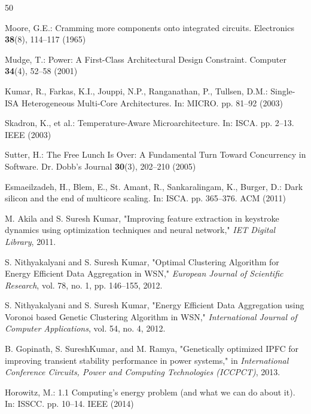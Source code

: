 \documentclass[conference]{IEEEtran}
\begin{document}
\begin{thebibliography}{50}

 Moore, G.E.: Cramming more components onto integrated circuits. Electronics \textbf{38}(8), 114--117 (1965)

 Mudge, T.: Power: A First-Class Architectural Design Constraint. Computer \textbf{34}(4), 52--58 (2001)

 Kumar, R., Farkas, K.I., Jouppi, N.P., Ranganathan, P., Tullsen, D.M.: Single-ISA Heterogeneous Multi-Core Architectures. In: MICRO. pp. 81--92 (2003)

 Skadron, K., et al.: Temperature-Aware Microarchitecture. In: ISCA. pp. 2--13. IEEE (2003)


 Sutter, H.: The Free Lunch Is Over: A Fundamental Turn Toward Concurrency in Software. Dr. Dobb's Journal \textbf{30}(3), 202--210 (2005)

 Esmaeilzadeh, H., Blem, E., St. Amant, R., Sankaralingam, K., Burger, D.: Dark silicon and the end of multicore scaling. In: ISCA. pp. 365--376. ACM (2011)

 M. Akila and S. Suresh Kumar, "Improving feature extraction in keystroke dynamics using optimization techniques and neural network," \textit{IET Digital Library}, 2011.

 S. Nithyakalyani and S. Suresh Kumar, "Optimal Clustering Algorithm for Energy Efficient Data Aggregation in WSN," \textit{European Journal of Scientific Research}, vol. 78, no. 1, pp. 146--155, 2012.

 S. Nithyakalyani and S. Suresh Kumar, "Energy Efficient Data Aggregation using Voronoi based Genetic Clustering Algorithm in WSN," \textit{International Journal of Computer Applications}, vol. 54, no. 4, 2012.

 B. Gopinath, S. SureshKumar, and M. Ramya, "Genetically optimized IPFC for improving transient stability performance in power systems," in \textit{International Conference Circuits, Power and Computing Technologies (ICCPCT)}, 2013.

 Horowitz, M.: 1.1 Computing's energy problem (and what we can do about it). In: ISSCC. pp. 10--14. IEEE (2014)


\end{thebibliography}
\end{document}
